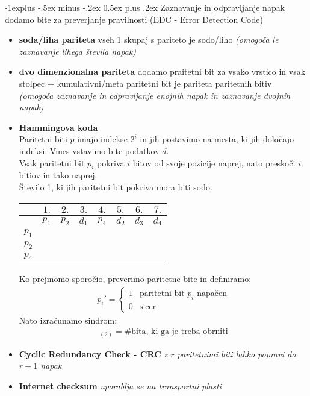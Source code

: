 \documentclass[a4paper,8pt]{extarticle}
\makeatletter
\renewcommand{\subsection}{\@startsection{subsection}{2}{0mm}%
                                {-1explus -.5ex minus -.2ex}%
                                {0.5ex plus .2ex}%
                                {\normalfont\normalsize\bfseries}}
\makeatother
\begin{document}
\begin{multicols}{4}
\subsection{Zaznavanje in odpravljanje napak}
dodamo bite za preverjanje pravilnosti (EDC - Error Detection Code)
\begin{itemize}
	\item \textbf{soda/liha pariteta} vseh 1 skupaj s pariteto je sodo/liho \emph{(omogoča le zaznavanje lihega števila napak)}
	\item \textbf{dvo dimenzionalna pariteta} dodamo praitetni bit za vsako
	vrstico in vsak stolpec + kumulativni/meta paritetni bit je
	pariteta paritetnih bitiv \emph{(omogoča zaznavanje in odpravljanje enojnih napak in zaznavanje dvojnih napak)}
	\item \textbf{Hammingova koda}\\
	Paritetni biti $p$ imajo indekse $2^i$ in jih postavimo na mesta, ki jih določajo indeksi. Vmes vstavimo bite podatkov $d$.\\
	Vsak paritetni bit $p_i$ pokriva $i$ bitov od svoje pozicije naprej, nato preskoči $i$ bitiov in tako naprej. \\
	Število 1, ki jih paritetni bit pokriva mora biti sodo.
	\begin{tabular}{c | *{7}{c}}
			& $1.$ & $2.$ & $3.$ & $4.$ & $5.$ & $6.$ & $7.$ \\ \hline
			& $p_1$ & $p_2$ & $d_1$ & $p_4$ & $d_2$ & $d_3$ & $d_4$ \\ \hline
		$p_1$	&\checkmark& &\checkmark& &\checkmark& &\checkmark \\
		$p_2$	& &\checkmark&\checkmark& & &\checkmark&\checkmark \\
		$p_4$ 	& & & &\checkmark&\checkmark&\checkmark&\checkmark
	\end{tabular}

	Ko prejmomo sporočio, preverimo paritetne bite in definiramo:
	\begin{align*}	
		p_i' = \begin{cases}
			1 & \text{paritetni bit $p_i$ napačen}\\
			0 & \text{sicer}
		\end{cases}
	\end{align*}
	Nato izračunamo sindrom:
	\begin{align*}
		 [ \dots p'_4\ p'_2\ p'_1 ]_{(2)} = \text{\# bita, ki ga je treba obrniti}
	\end{align*} 
	\item \textbf{Cyclic Redundancy Check - CRC} \emph{z $r$ paritetnimi biti lahko popravi do $r+1$ napak}
	\item \textbf{Internet checksum} \emph{uporablja se na transportni plasti}
\end{itemize}


\end{multicols}
\end{document}
